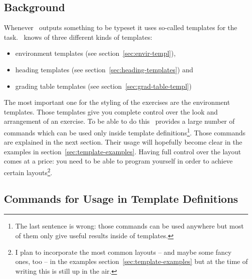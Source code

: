 \documentclass{xsim-manual}
\begin{document}
\subsection{Background}
Whenever \xsim\ outputs something to be typeset it uses so-called templates
for the task.  \xsim\ knows of three different kinds of templates:
\begin{itemize}
  \item environment templates (see section~\vref{sec:envir-templ}),
  \item heading templates (see section~\vref{sec:heading-templates}) and
  \item grading table templates (see section~\vref{sec:grad-table-templ})
\end{itemize}

The most important one for the styling of the exercises are the environment
templates.  Those templates give you complete control over the look and
arrangement of an exercise.  To be able to do this \xsim\ provides a large
number of commands which can be used only inside template
definitions\footnote{The last sentence is wrong: those commands can be used
  anywhere but most of them only give useful results inside of templates.}.
Those commands are explained in the next section.  Their usage will hopefully
become clear in the examples in section~\vref{sec:template-examples}. Having
full control over the layout comes at a price: you need to be able to program
yourself in order to achieve certain layouts\footnote{I plan to incorporate
  the most common layouts -- and maybe some fancy ones, too -- in the examples
  section~\vref{sec:template-examples} but at the time of writing this is still
  up in the air.}.

\subsection{Commands for Usage in Template Definitions}
\end{document}
